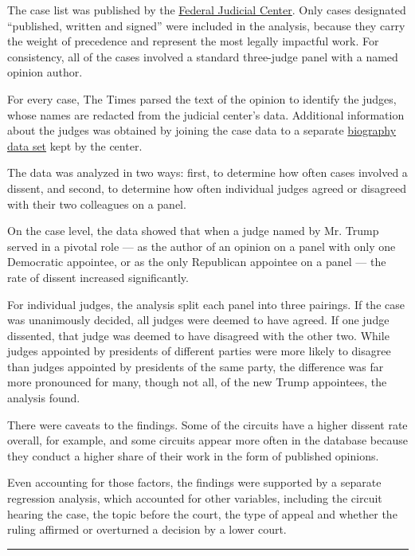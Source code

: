 The case list was published by the
\href{https://www.fjc.gov/research/idb/appellate-cases-filed-terminated-and-pending-fy-2008-present}{Federal
Judicial Center}. Only cases designated ``published, written and
signed'' were included in the analysis, because they carry the weight of
precedence and represent the most legally impactful work. For
consistency, all of the cases involved a standard three-judge panel with
a named opinion author.

For every case, The Times parsed the text of the opinion to identify the
judges, whose names are redacted from the judicial center's data.
Additional information about the judges was obtained by joining the case
data to a separate \href{https://www.fjc.gov/history/judges}{biography
data set} kept by the center.

The data was analyzed in two ways: first, to determine how often cases
involved a dissent, and second, to determine how often individual judges
agreed or disagreed with their two colleagues on a panel.

On the case level, the data showed that when a judge named by Mr. Trump
served in a pivotal role --- as the author of an opinion on a panel with
only one Democratic appointee, or as the only Republican appointee on a
panel --- the rate of dissent increased significantly.

For individual judges, the analysis split each panel into three
pairings. If the case was unanimously decided, all judges were deemed to
have agreed. If one judge dissented, that judge was deemed to have
disagreed with the other two. While judges appointed by presidents of
different parties were more likely to disagree than judges appointed by
presidents of the same party, the difference was far more pronounced for
many, though not all, of the new Trump appointees, the analysis found.

There were caveats to the findings. Some of the circuits have a higher
dissent rate overall, for example, and some circuits appear more often
in the database because they conduct a higher share of their work in the
form of published opinions.

Even accounting for those factors, the findings were supported by a
separate regression analysis, which accounted for other variables,
including the circuit hearing the case, the topic before the court, the
type of appeal and whether the ruling affirmed or overturned a decision
by a lower court.

\begin{center}\rule{0.5\linewidth}{\linethickness}\end{center}


